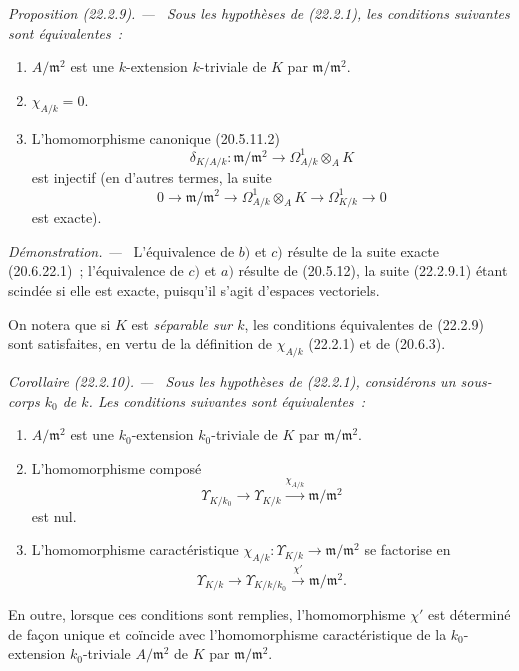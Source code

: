 \documentclass[10pt,oneside]{book}
\makeatletter
\newcommand{\setmanualcurrentlabel}[1]{\def\@currentlabel{#1}}
\newenvironment{proposition}[1][]{%
  \setmanualcurrentlabel{#1}\par\medskip\noindent\itshape Proposition (#1). ---\ }{\par}
\newenvironment{corollary}[1][]{%
  \setmanualcurrentlabel{#1}\par\medskip\noindent\itshape Corollaire (#1). ---\ }{\par}
\newenvironment{proof}{%
  \par\medskip\noindent\textit{Démonstration. ---\ }}{\par}
\makeatother
\begin{document}
\begin{proposition}[22.2.9]
\label{0.22.2.9-fr}
Sous les hypothèses de (22.2.1), les conditions suivantes sont
équivalentes~:
\begin{enumerate}
  \item[a)] $A/\mathfrak m^2$ est une $k$-extension $k$-triviale de $K$ par
  $\mathfrak m/\mathfrak m^2$.
  \item[b)] $\chi_{A/k}=0$.
  \item[c)] L'homomorphisme canonique (20.5.11.2)
  \[
    \delta_{K/A/k}:\mathfrak m/\mathfrak m^2
    \longrightarrow\Omega^1_{A/k}\otimes_AK
  \]
  est injectif (en d'autres termes, la suite
  \begin{equation}
  \tag{22.2.9.1}
  \label{0.22.2.9.1-fr}
    0\longrightarrow\mathfrak m/\mathfrak m^2
    \longrightarrow\Omega^1_{A/k}\otimes_AK
    \longrightarrow\Omega^1_{K/k}\longrightarrow0
  \end{equation}
  est exacte).
\end{enumerate}
\end{proposition}

\begin{proof}
L'équivalence de $b)$ et $c)$ résulte de la suite exacte (20.6.22.1)~;
l'équivalence de $c)$ et $a)$ résulte de (20.5.12), la suite (22.2.9.1)
étant scindée si elle est exacte, puisqu'il s'agit d'espaces vectoriels.

On notera que si $K$ est \emph{séparable sur $k$}, les conditions
équivalentes de (22.2.9) sont satisfaites, en vertu de la définition de
$\chi_{A/k}$ (22.2.1) et de (20.6.3).
\end{proof}

\begin{corollary}[22.2.10]
\label{0.22.2.10-fr}
Sous les hypothèses de (22.2.1), considérons un sous-corps $k_0$ de $k$. Les
conditions suivantes sont équivalentes~:
\begin{enumerate}
  \item[a)] $A/\mathfrak m^2$ est une $k_0$-extension $k_0$-triviale de $K$
  par $\mathfrak m/\mathfrak m^2$.
  \item[b)] L'homomorphisme composé
  \[
    \Upsilon_{K/k_0}\longrightarrow\Upsilon_{K/k}
    \xrightarrow{\chi_{A/k}}\mathfrak m/\mathfrak m^2
  \]
  est nul.
  \item[c)] L'homomorphisme caractéristique
  $\chi_{A/k}:\Upsilon_{K/k}\to\mathfrak m/\mathfrak m^2$ se factorise en
  \[
    \Upsilon_{K/k}\longrightarrow\Upsilon_{K/k/k_0}
    \xrightarrow{\chi'}\mathfrak m/\mathfrak m^2.
  \]
\end{enumerate}
En outre, lorsque ces conditions sont remplies, l'homomorphisme $\chi'$ est
déterminé de façon unique et coïncide avec l'homomorphisme caractéristique
de la $k_0$-extension $k_0$-triviale $A/\mathfrak m^2$ de $K$ par
$\mathfrak m/\mathfrak m^2$.
\end{corollary}
\end{document}
